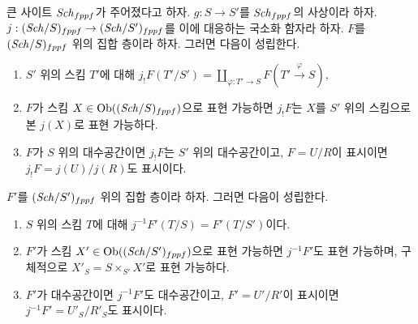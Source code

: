 \begin{lemma}
\label{lemma-change-base-scheme}
큰 사이트 $\mathit{Sch}_{fppf}$가 주어졌다고 하자.
$g : S \to S'$를 $\mathit{Sch}_{fppf}$의 사상이라 하자.
$j : (\mathit{Sch}/S)_{fppf} \to (\mathit{Sch}/S')_{fppf}$를 이에 대응하는
국소화 함자라 하자.
$F$를 $(\mathit{Sch}/S)_{fppf}$ 위의 집합 층이라 하자.
그러면 다음이 성립한다.
\begin{enumerate}
\item $S'$ 위의 스킴 $T'$에 대해
$j_!F(T'/S') =
\coprod\nolimits_{\varphi : T' \to S} F(T' \xrightarrow{\varphi} S),$
\item $F$가 스킴
$X \in \mathop{\mathrm{Ob}}\nolimits((\mathit{Sch}/S)_{fppf})$으로 표현 가능하면
$j_!F$는 $X$를 $S'$ 위의 스킴으로 본 $j(X)$로 표현 가능하다.
\item $F$가 $S$ 위의 대수공간이면 $j_!F$는 $S'$ 위의
대수공간이고, $F = U/R$이 표시이면
$j_!F = j(U)/j(R)$도 표시이다.
\end{enumerate}
$F'$를 $(\mathit{Sch}/S')_{fppf}$ 위의 집합 층이라 하자. 그러면 다음이
성립한다.
\begin{enumerate}
\item[(4)] $S$ 위의 스킴 $T$에 대해 $j^{-1}F'(T/S) = F'(T/S')$이다.
\item[(5)] $F'$가 스킴
$X' \in \mathop{\mathrm{Ob}}\nolimits((\mathit{Sch}/S')_{fppf})$으로 표현 가능하면
$j^{-1}F'$도 표현 가능하며, 구체적으로
$X'_S = S \times_{S'} X'$로 표현 가능하다.
\item[(6)] $F'$가 대수공간이면 $j^{-1}F'$도 대수공간이고,
$F' = U'/R'$이 표시이면 $j^{-1}F' = U'_S/R'_S$도 표시이다.
\end{enumerate}
\end{lemma}

